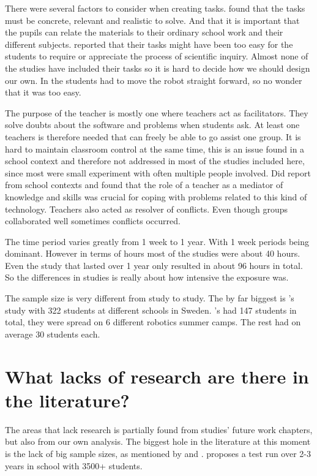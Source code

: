 \bigskip\noindent
There were several factors to consider when creating tasks.  found that the tasks must be concrete, relevant and realistic  to solve. And that it is important that the pupils can relate the materials to their ordinary school work and their different subjects.  reported that their tasks might have been too easy for the students to require or appreciate the process of  scientific inquiry. Almost none of the studies have included their tasks so it is hard to decide how we should design our own. In  the students had to move the robot straight forward, so no wonder that it was too easy.

\bigskip\noindent
The purpose of the teacher is mostly one where teachers act as facilitators. They solve doubts about the software and problems when students ask. At least one teachers is therefore needed that can freely be able to go assist one group. It is hard to maintain classroom control at the same time, this is an issue found in a school context and therefore not addressed in most of the studies included here, since most were small experiment with often multiple people involved.  Did report from school contexts and found that the role of a teacher as a mediator of knowledge and skills was crucial for coping with problems related to this kind of technology. Teachers also acted as resolver of conflicts. Even though groups collaborated well sometimes conflicts occurred. 

\bigskip\noindent
The time period varies greatly from 1 week to 1 year. With 1 week periods being dominant. However in terms of hours most of the studies were about 40 hours. Even the study that lasted over 1 year only resulted in about 96 hours in total. So the differences in studies is really about how intensive the exposure was. 

\bigskip\noindent
The sample size is very different from study to study. The by far biggest is 's study with 322 students at different schools in Sweden. 's had 147 students in total, they were spread on 6 different robotics summer camps. The rest had on average 30 students each.

\section{What lacks of research are there in the literature?}

The areas that lack research is partially found from studies' future work chapters, but also from our own analysis. The biggest hole in the literature at this moment is the lack of big sample sizes, as mentioned by  and . 
 proposes a test run over 2-3 years in school with 3500+ students. 

